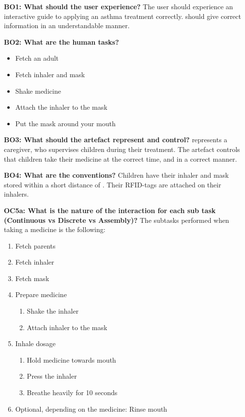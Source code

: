 \textbf{BO1: What should the user experience?}
The user should experience an interactive guide to applying an asthma treatment correctly. \buddy{} should give correct information in an understandable manner. 


\textbf{BO2: What are the human tasks?}
\begin{itemize}
  \item Fetch an adult
  \item Fetch inhaler and mask
  \item Shake medicine
  \item Attach the inhaler to the mask
  \item Put the mask around your mouth
\end{itemize}

\textbf{BO3: What should the artefact represent and control?}
\buddy{} represents a caregiver, who supervises children during their treatment. The artefact controls that children take their medicine at the correct time, and in a correct manner.   

\textbf{BO4: What are the conventions?}
Children have their inhaler and mask stored within a short distance of \buddy{}. Their RFID-tags are attached on their inhalers.    

\textbf{OC5a: What is the nature of the interaction for each sub task (Continuous vs Discrete vs Assembly)?}
The subtasks performed when taking a medicine is the following:
\begin{enumerate}
  \item Fetch parents
  \item Fetch inhaler
  \item Fetch mask
  \item Prepare medicine
  	\begin{enumerate}
  	  \item Shake the inhaler
  	  \item Attach inhaler to the mask
  	 \end{enumerate}
  \item Inhale dosage
  	\begin{enumerate}
  	  \item Hold medicine towards mouth
  	  \item Press the inhaler
  	  \item Breathe heavily for 10 seconds
  	 \end{enumerate}
  \item Optional, depending on the medicine: Rinse mouth
\end{enumerate}

